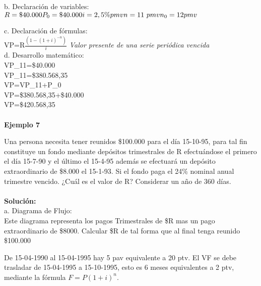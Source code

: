 {b. Declaración de variables:\\

$	
	R=\$40.000\\	
	P_{0}=\$40.000\\
	i=2,5\% pmv \\
    n={11}\ pmv\\
	n_{0}=12 pmv\\
$

c. Declaración de fórmulas:\\

	VP=R$\frac{(1-(1+i)^{-n})}{i}$ \hspace{35}\textit{Valor  presente de  una  serie  periódica  vencida}\\


d. Desarrollo matemático: \\                                

	VP_{11}=\$40.000 \\
	VP_{11}=\$380.568,35\\
	VP=VP_{11}+P_{0}\\
	VP=\$380.568,35+\$40.000\\
	VP=\$420.568,35\\\\


\textbf{Ejemplo 7}

\vspace{5mm}
Una persona necesita tener reunidos \$100.000 para el día 15-10-95, para tal fin constituye un fondo mediante depósitos trimestrales de R efectuándose el primero el día 15-7-90 y el último el 15-4-95 además se efectuará un depósito extraordinario de \$8.000 el 15-1-93. Si el fondo paga el 24\% nominal anual trimestre vencido. ¿Cuál es el valor de R? Considerar un año de 360 días.
\\\\
\textbf{Solución:}
\\
a. Diagrama de Flujo:\\

Este diagrama representa los pagos Trimestrales de \$R mas un pago extraordinario de \$8000. Calcular \$R de tal forma que al final tenga reunido \$100.000

\vspace{5mm}

De 15-04-1990 al 15-04-1995 hay 5 pav equivalente a 20 ptv. El VF se debe trasladar  de 15-04-1995 a 15-10-1995, esto es 6 meses equivalentes a 2 ptv, mediante la fórmula $F = P (1+i)^n.$

}
